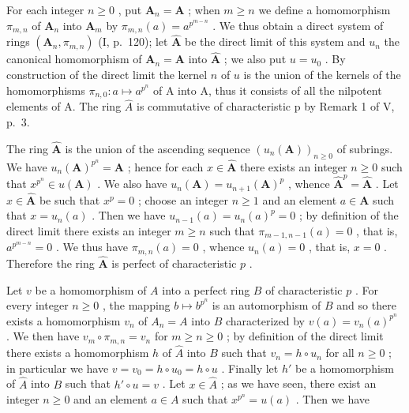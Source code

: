 For each integer \(n \geqslant 0\) , put \(\mathbf{A}_n = \mathbf{A}\) ; when \(m \geqslant n\) we define a homomorphism \(\pi_{m,n}\) of \(\mathbf{A}_n\) into \(\mathbf{A}_m\) by \(\pi_{m,n}(a) = a^{p^{m-n}}\) . We thus obtain a direct system of rings \((\mathbf{A}_n, \pi_{m,n})\) (I, p.~120); let \(\hat{\mathbf{A}}\) be the direct limit of this system and \(u_n\) the canonical homomorphism of \(\mathbf{A}_n = \mathbf{A}\) into \(\hat{\mathbf{A}}\) ; we also put \(u = u_0\) . By construction of the direct limit the kernel \(n\) of \(u\) is the union of the kernels of the homomorphisms \(\pi_{n,0}: a \mapsto a^{p^n}\) of A into A, thus it consists of all the nilpotent elements of A. The ring \(\hat{A}\) is commutative of characteristic p by Remark 1 of V, p.~3.

The ring \(\hat{\mathbf{A}}\) is the union of the ascending sequence \((u_n(\mathbf{A}))_{n\geq 0}\) of subrings. We have \(u_{n}(\mathbf{A})^{p^{n}} = \mathbf{A}\) ; hence for each \(x\in \hat{\mathbf{A}}\) there exists an integer \(n\geqslant 0\) such that \(x^{p^n}\in u(\mathbf{A})\) . We also have \(u_{n}(\mathbf{A}) = u_{n + 1}(\mathbf{A})^{p}\) , whence \(\hat{\mathbf{A}}^p = \hat{\mathbf{A}}\) . Let \(x\in \hat{\mathbf{A}}\) be such that \(x^{p} = 0\) ; choose an integer \(n\geqslant 1\) and an element \(a\in \mathbf{A}\) such that \(x = u_{n}(a)\) . Then we have \(u_{n - 1}(a) = u_n(a)^p = 0\) ; by definition of the direct limit there exists an integer \(m\geqslant n\) such that \(\pi_{m - 1,n - 1}(a) = 0\) , that is, \(a^{p^{m - n}} = 0\) . We thus have \(\pi_{m,n}(a) = 0\) , whence \(u_{n}(a) = 0\) , that is, \(x = 0\) . Therefore the ring \(\hat{\mathbf{A}}\) is perfect of characteristic \(p\) .

Let \(v\) be a homomorphism of \(A\) into a perfect ring \(B\) of characteristic \(p\) . For every integer \(n \geqslant 0\) , the mapping \(b \mapsto b^{p^n}\) is an automorphism of \(B\) and so there exists a homomorphism \(v_n\) of \(A_n = A\) into \(B\) characterized by \(v(a) = v_n(a)^{p^n}\) . We then have \(v_m \circ \pi_{m,n} = v_n\) for \(m \geqslant n \geqslant 0\) ; by definition of the direct limit there exists a homomorphism \(h\) of \(\hat{A}\) into \(B\) such that \(v_n = h \circ u_n\) for all \(n \geqslant 0\) ; in particular we have \(v = v_0 = h \circ u_0 = h \circ u\) . Finally let \(h'\) be a homomorphism of \(\hat{A}\) into \(B\) such that \(h' \circ u = v\) . Let \(x \in \hat{A}\) ; as we have seen, there exist an integer \(n \geqslant 0\) and an element \(a \in A\) such that \(x^{p^n} = u(a)\) . Then we have

